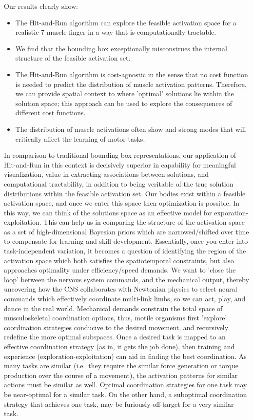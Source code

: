 Our results clearly show:
\begin{itemize}
	\item{The Hit-and-Run algorithm can explore the feasible activation space for a realistic 7-muscle finger in a way that is computationally tractable.}
	\item{We find that the bounding box exceptionally misconstrues the internal structure of the feasible activation set.}
	\item{The Hit-and-Run algorithm is cost-agnostic in the sense that no cost function is needed to predict the distribution of muscle activation patterns. Therefore, we can provide spatial context to where 'optimal' solutions lie within the solution space; this approach can be used to explore the consequences of different cost functions.}
	\item{The distribution of muscle activations often show and strong modes that will critically affect the learning of motor tasks.}
\end{itemize}
In comparison to traditional bounding-box representations, our application of Hit-and-Run in this context is decisively superior in capability for meaningful visualization, value in extracting associations between solutions, and computational tractability, in addition to being veritable of the true solution distributions within the feasible activation set. Our bodies exist within a feasible activation space, and once we enter this space then optimization is possible. In this way, we can think of the solutions space as an effective model for exporation-exploitation.
This can help us in comparing the structure of the activation space as a set of high-dimensional Bayesian priors which are narrowed/shifted over time to compensate for learning and skill-development.
Essentially, once you enter into task-independent variation, it becomes a question of identifying the region of the activation space which both satisfies the spatiotemporal constraints, but also approaches optimality under efficiency/speed demands.
We want to 'close the loop' between the nervous system commands, and the mechanical output, thereby uncovering how the CNS collaborates with Newtonian physics to select neural commands which effectively coordinate multi-link limbs, so we can act, play, and dance in the real world.
Mechanical demands constrain the total space of musculoskeletal coordination options, thus, motile organisms first 'explore' coordination strategies conducive to the desired movement, and recursively redefine the more optimal subspaces.
Once a desired task is mapped to an effective coordination strategy (as in, it gets the job done), then training and experience (exploration-exploitation) can aid in finding the best coordination.
As many tasks are similar (i.e.\ they require the similar force generation or torque production over the course of a movement),  the activation patterns for similar actions must be similar as well.
Optimal coordination strategies for one task may be near-optimal for a similar task.
On the other hand, a suboptimal coordination strategy that achieves one task, may be furiously off-target for a very similar task.

